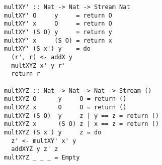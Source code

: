 \begin{figure}[!t]
  \centering
  \begin{minipage}{\columnwidth}
    \begin{lstlisting}[label={mult_slow}, caption={Inefficient implementation of \lstinline{multo in in out} direciton}, captionpos=b, frame=tb]
multXY' :: Nat -> Nat -> Stream Nat
multXY' O     y     = return O
multXY' x     O     = return O
multXY' (S O) y     = return y
multXY' x     (S O) = return x
multXY' (S x') y    = do
  (r', r) <- addX y
  multXYZ x' y r'
  return r

multXYZ :: Nat -> Nat -> Nat -> Stream ()
multXYZ O      y     O = return ()
multXYZ x      O     O = return ()
multXYZ (S O)  y     z | y == z = return ()
multXYZ x      (S O) z | x == z = return ()
multXYZ (S x') y     z = do
  z' <- multXY' x' y
  addXYZ y z' z
multXYZ _ _ _ = Empty
    \end{lstlisting}
  \end{minipage}
\end{figure}
